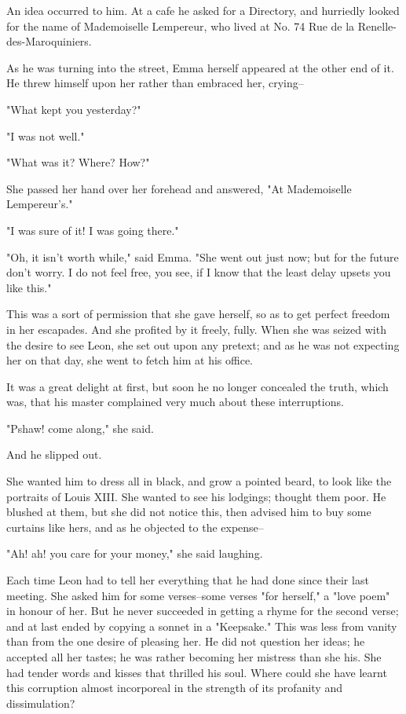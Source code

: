 \documentclass[11pt,twocolumn]{ltugboat}
\begin{document}
An idea occurred to him. At a cafe he asked for a Directory, and
hurriedly looked for the name of Mademoiselle Lempereur, who lived at
No. 74 Rue de la Renelle-des-Maroquiniers.

As he was turning into the street, Emma herself appeared at the other
end of it. He threw himself upon her rather than embraced her, crying--

"What kept you yesterday?"

"I was not well."

"What was it? Where? How?"

She passed her hand over her forehead and answered, "At Mademoiselle
Lempereur's."

"I was sure of it! I was going there."

"Oh, it isn't worth while," said Emma. "She went out just now; but for
the future don't worry. I do not feel free, you see, if I know that the
least delay upsets you like this."

This was a sort of permission that she gave herself, so as to get
perfect freedom in her escapades. And she profited by it freely, fully.
When she was seized with the desire to see Leon, she set out upon any
pretext; and as he was not expecting her on that day, she went to fetch
him at his office.

It was a great delight at first, but soon he no longer concealed the
truth, which was, that his master complained very much about these
interruptions.

"Pshaw! come along," she said.

And he slipped out.

She wanted him to dress all in black, and grow a pointed beard, to
look like the portraits of Louis XIII. She wanted to see his lodgings;
thought them poor. He blushed at them, but she did not notice this, then
advised him to buy some curtains like hers, and as he objected to the
expense--

"Ah! ah! you care for your money," she said laughing.

Each time Leon had to tell her everything that he had done since their
last meeting. She asked him for some verses--some verses "for herself,"
a "love poem" in honour of her. But he never succeeded in getting a
rhyme for the second verse; and at last ended by copying a sonnet in
a "Keepsake." This was less from vanity than from the one desire of
pleasing her. He did not question her ideas; he accepted all her tastes;
he was rather becoming her mistress than she his. She had tender words
and kisses that thrilled his soul. Where could she have learnt this
corruption almost incorporeal in the strength of its profanity and
dissimulation?
\end{document}
